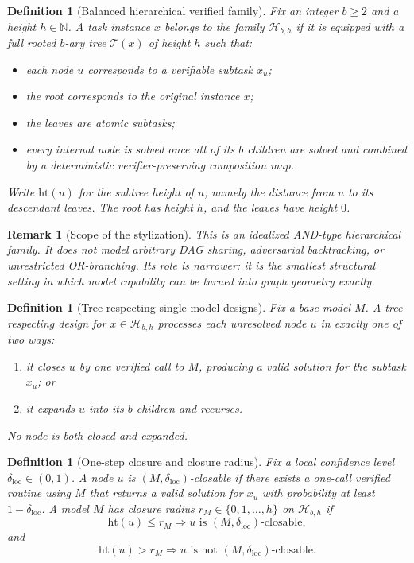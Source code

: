 \documentclass[10pt]{article}
\theoremstyle{paperplain}
\theoremstyle{paperdefinition}
\newtheorem{definition}[theorem]{Definition}
\theoremstyle{paperremark}
\newtheorem{remark}[theorem]{Remark}
\begin{document}
\begin{definition}[Balanced hierarchical verified family]
\label{def:hierarchical-family}
Fix an integer $b\ge 2$ and a height $h\in\mathbb N$.
A task instance $x$ belongs to the family $\mathcal H_{b,h}$ if it is equipped with a full rooted $b$-ary tree $\mathcal T(x)$ of height $h$ such that:
\begin{itemize}
\item each node $u$ corresponds to a verifiable subtask $x_u$;
\item the root corresponds to the original instance $x$;
\item the leaves are atomic subtasks;
\item every internal node is solved once all of its $b$ children are solved and combined by a deterministic verifier-preserving composition map.
\end{itemize}
Write $\mathrm{ht}(u)$ for the subtree height of $u$, namely the distance from $u$ to its descendant leaves.
The root has height $h$, and the leaves have height $0$.
\end{definition}

\begin{remark}[Scope of the stylization]
This is an idealized AND-type hierarchical family.
It does not model arbitrary DAG sharing, adversarial backtracking, or unrestricted OR-branching.
Its role is narrower: it is the smallest structural setting in which model capability can be turned into graph geometry exactly.
\end{remark}

\begin{definition}[Tree-respecting single-model designs]
\label{def:tree-respecting}
Fix a base model $M$.
A tree-respecting design for $x\in\mathcal H_{b,h}$ processes each unresolved node $u$ in exactly one of two ways:
\begin{enumerate}
\item it closes $u$ by one verified call to $M$, producing a valid solution for the subtask $x_u$; or
\item it expands $u$ into its $b$ children and recurses.
\end{enumerate}
No node is both closed and expanded.
\end{definition}

\begin{definition}[One-step closure and closure radius]
\label{def:closure-radius}
Fix a local confidence level $\delta_{\mathrm{loc}}\in(0,1)$.
A node $u$ is $(M,\delta_{\mathrm{loc}})$-closable if there exists a one-call verified routine using $M$ that returns a valid solution for $x_u$ with probability at least $1-\delta_{\mathrm{loc}}$.
A model $M$ has closure radius $r_M\in\{0,1,\dots,h\}$ on $\mathcal H_{b,h}$ if
\[
\mathrm{ht}(u)\le r_M \Longrightarrow u \text{ is } (M,\delta_{\mathrm{loc}})\text{-closable},
\]
and
\[
\mathrm{ht}(u)> r_M \Longrightarrow u \text{ is not } (M,\delta_{\mathrm{loc}})\text{-closable}.
\]
\end{definition}
\end{document}
